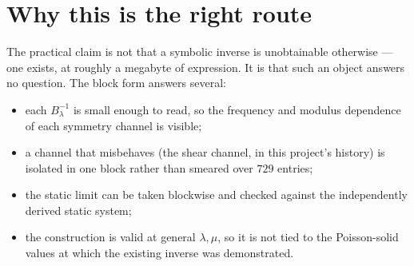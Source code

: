\documentclass[11pt]{article}
\begin{document}
\section{Why this is the right route}

The practical claim is not that a symbolic inverse is unobtainable otherwise ---
one exists, at roughly a megabyte of expression. It is that such an object
answers no question. The block form answers several:

\begin{itemize}
\item each $B_\lambda^{-1}$ is small enough to read, so the frequency and
      modulus dependence of each symmetry channel is visible;
\item a channel that misbehaves (the shear channel, in this project's history)
      is isolated in one block rather than smeared over $729$ entries;
\item the static limit can be taken blockwise and checked against the
      independently derived static system;
\item the construction is valid at general $\lambda,\mu$, so it is not tied to
      the Poisson-solid values at which the existing inverse was demonstrated.
\end{itemize}
\end{document}
